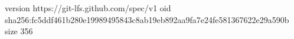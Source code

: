 version https://git-lfs.github.com/spec/v1
oid sha256:fc5ddf461b280e19989495843c8ab19eb892aa9fa7e24fe581367622e29a590b
size 356
